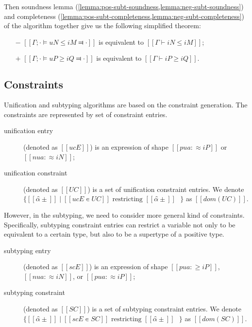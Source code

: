 \documentclass[a4,natbib=false]{article}
\begin{document}
Then soundness lemma (\cref{lemma:pos-subt-soundness,lemma:neg-subt-soundness}) 
and completeness (\cref{lemma:pos-subt-completeness,lemma:neg-subt-completeness})
of the algorithm together give us the following simplified theorem:

\begin{theorempreview}
  \hfill
  \begin{itemize}
    \item [$-$]  $[[ Γ ; · ⊨ uN ≤ iM ⫤ · ]]$ is equivalent to $[[ Γ ⊢ iN ≤ iM ]]$;
    \item [$+$] $[[ Γ ; · ⊨ uP ≥ iQ ⫤ · ]]$ is equivalent to $[[ Γ ⊢ iP ≥ iQ ]]$.
  \end{itemize}
\end{theorempreview}


\subsection{Constraints}

Unification and subtyping algorithms are based on the constraint generation.
The constraints are represented by set of constraint entries.

\begin{definition}
  \hfill
  \begin{description}
    \item[unification entry] (denoted as $[[ucE]]$) is an expression of shape 
      $[[pua :≈ iP]]$ or $[[nua :≈ iN]]$;
    \item[unification constraint] (denoted as $[[UC]]$) is a set of 
      unification constraint entries.
      We denote $\{[[α̂±]] \mid [[ucE ∊ UC]] \text{ restricting $[[α̂±]]$ }\}$ 
      as $[[dom(UC)]]$.
  \end{description}
\end{definition}

However, in the subtyping, we need to consider more general
kind of constraints. Specifically,
subtyping constraint entries can restrict a variable
not only to be equivalent to a certain type, but
also to be a supertype of a positive type.

\begin{definition}
  \hfill
  \begin{description}
    \item[subtyping entry] (denoted as $[[scE]]$) is an expression of shape 
      $[[pua :≥ iP]]$, $[[nua :≈ iN]]$, or $[[pua :≈ iP]]$;
    \item[subtyping constraint] (denoted as $[[SC]]$) is a set of subtyping constraint entries.
      We denote $\{[[α̂±]] \mid [[scE ∊ SC]] \text{ restricting $[[α̂±]]$ }\}$ 
      as $[[dom(SC)]]$.
  \end{description}
\end{definition}
\end{document}
